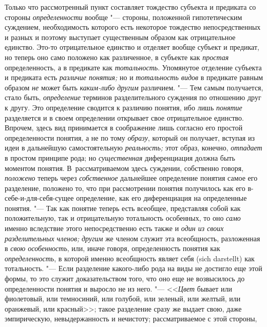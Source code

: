 Только что рассмотренный пункт составляет тождество субъекта и
предиката со стороны {\em определенности}
вообще "--- стороны, положенной гипотетическим
суждением, необходимость которого есть некоторое тождество непосредственных
и разных и поэтому выступает существенным образом как отрицательное
единство. Это-то отрицательное единство и отделяет вообще субъект и
предикат, но теперь оно само положено как различенное, в субъекте как
{\em простая} определенность, а в предикате как {\em тотальность}.
Упомянутое отделение субъекта и предиката есть {\em различие понятия;}
но и {\em тотальность видов} в предикате равным образом {\em не} может быть
{\em каким-либо другим} различием. "--- Тем самым получается, стало быть,
{\em определение} терминов разделительного суждения по отношению друг к другу.
Это определение сводится к различию понятия, ибо лишь {\em понятие} разделяется
и в своем определении открывает свое отрицательное единство. Впрочем, здесь
вид принимается в соображение лишь согласно его простой определенности
понятия, а не по тому {\em образу}, который он получает, вступая из идеи
в дальнейшую самостоятельную {\em реальность;} этот образ, конечно,
{\em отпадает} в простом принципе рода; но {\em существенная}
диференциация должна быть моментом понятия. В~рассматриваемом здесь
суждении, собственно говоря, {\em положено} теперь через {\em собственное}
дальнейшее определение понятия самое его разделение, положено
то, что при рассмотрении понятия получилось как его в-себе-и-для-себя-сущее
определение, как его диференциация на определенные понятия. "---
Так как понятие теперь есть всеобщее, представляя собой как
положительную, так и отрицательную тотальность особенных, то оно
{\em само} именно вследствие этого непосредственно есть также и
{\em один из своих разделительных членов;} {\em другим} же
членом служит эта всеобщность, разложенная в {\em свою особенность},
или, иначе говоря, определенность понятия как {\em определенность}, в
которой именно всеобщность являет себя (sich darstellt) как
тотальность. "--- Если разделение какого-либо рода на виды не
достигло еще этой формы, то это служит доказательством того, что оно еще не
возвысилось до определенности понятия и выросло не из него. "---
<<{\em Цвет} бывает или фиолетовый, или темносиний, или голубой, или
зеленый, или желтый, или оранжевый, или красный>>;
такое разделение сразу же выдает свою, даже
эмпирическую, невыдержанность и нечистоту; рассматриваемое с этой стороны,
